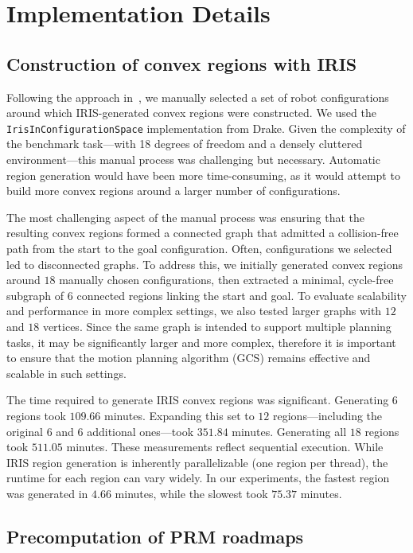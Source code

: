 \section{Implementation Details}

\subsection{Construction of convex regions with IRIS}
\label{IRIS_details}
Following the approach in~\cite{marcucci2023motion}, we manually selected a set of robot configurations around which IRIS-generated convex regions were constructed. We used the \texttt{IrisInConfigurationSpace} implementation from Drake. Given the complexity of the benchmark task—with 18 degrees of freedom and a densely cluttered environment—this manual process was challenging but necessary. Automatic region generation would have been more time-consuming, as it would attempt to build more convex regions around a larger number of configurations. 

The most challenging aspect of the manual process was ensuring that the resulting convex regions formed a connected graph that admitted a collision-free path from the start to the goal configuration. Often, configurations we selected led to disconnected graphs. To address this, we initially generated convex regions around $18$ manually chosen configurations, then extracted a minimal, cycle-free subgraph of $6$ connected regions linking the start and goal. To evaluate scalability and performance in more complex settings, we also tested larger graphs with $12$ and $18$ vertices. Since the same graph is intended to support multiple planning tasks, it may be significantly larger and more complex, therefore it is important to ensure that the motion planning algorithm (GCS) remains effective and scalable in such settings.

The time required to generate IRIS convex regions was significant. Generating $6$ regions took $109.66$ minutes. Expanding this set to $12$ regions---including the original $6$ and $6$ additional ones---took $351.84$ minutes. Generating all $18$ regions took $511.05$ minutes. These measurements reflect sequential execution. While IRIS region generation is inherently parallelizable (one region per thread), the runtime for each region can vary widely. In our experiments, the fastest region was generated in $4.66$ minutes, while the slowest took $75.37$ minutes.

\subsection{Precomputation of PRM roadmaps}

